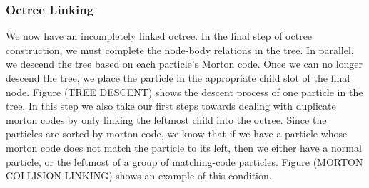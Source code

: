 \documentclass{thesis}
\begin{document}
\begin{algorithm}
\begin{algorithmic}
                \EndIf
            \Else
        
            \EndIf
        \EndFor
    \end{algorithmic}
\end{algorithm}

\subsubsection{Octree Linking}
We now have an incompletely linked octree. In the final step of octree construction, we must complete the node-body relations in the tree. In parallel, we descend the tree based on each particle's Morton code. Once we can no longer descend the tree, we place the particle in the appropriate child slot of the final node. Figure (TREE DESCENT) shows the descent process of one particle in the tree. In this step we also take our first steps towards dealing with duplicate morton codes by only linking the leftmost child into the octree. Since the particles are sorted by morton code, we know that if we have a particle whose morton code does not match the particle to its left, then we either have a normal particle, or the leftmost of a group of matching-code particles. Figure (MORTON COLLISION LINKING) shows an example of this condition.

\end{document}
